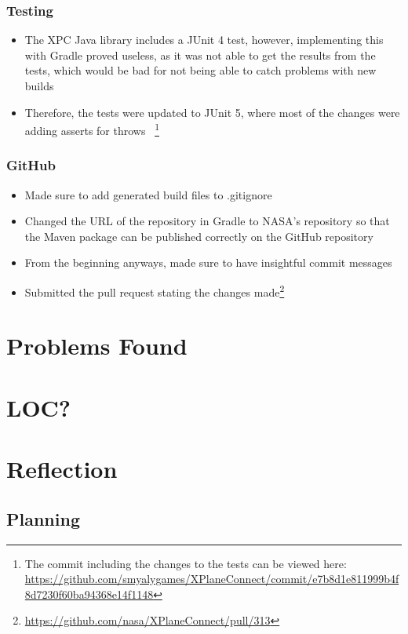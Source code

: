 \documentclass[../dissertation.tex]{subfiles}
\begin{document}
\subsubsection{Testing}
\begin{itemize}
  \item The XPC Java library includes a JUnit 4 test, however, implementing this
    with Gradle proved useless, as it was not able to get the results from the
    tests, which would be bad for not being able to catch problems with new builds
  \item Therefore, the tests were updated to JUnit 5, where most of the changes were
    adding asserts for throws~\cite{junit:migrate}
    \footnote{The commit including the changes to the tests can be viewed here:
    \url{https://github.com/smyalygames/XPlaneConnect/commit/e7b8d1e811999b4f8d7230f60ba94368e14f1148}}
\end{itemize}

\subsubsection{GitHub}
\begin{itemize}
  \item Made sure to add generated build files to .gitignore
  \item Changed the URL of the repository in Gradle to NASA's repository so that
    the Maven package can be published correctly on the GitHub repository
  \item From the beginning anyways, made sure to have insightful commit messages
  \item Submitted the pull request stating the changes made\footnote{\url{https://github.com/nasa/XPlaneConnect/pull/313}}
\end{itemize}

\section{Problems Found}


\section{LOC?}


\section{Reflection}
\subsection{Planning}
\end{document}
